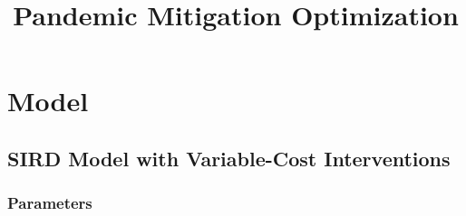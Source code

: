 \documentclass{article}
\title{
    Pandemic Mitigation Optimization
}
\newcommand{\FC}[1]{{\color{blue} [FC: #1] }}
\newcommand{\KR}[1]{{\color{purple} [KR: #1] }}
\newcommand{\UK}[1]{{\color{orange} [UK: #1] }}
\newcommand{\ZS}[1]{{\color{red} [Zach: #1] }}
\begin{document}
\maketitleunfinished




\tableofcontents


\section{Model}




\subsection{SIRD Model with Variable-Cost Interventions}\label{subsec:SIRD_model}
\subsubsection*{Parameters}
\end{document}

